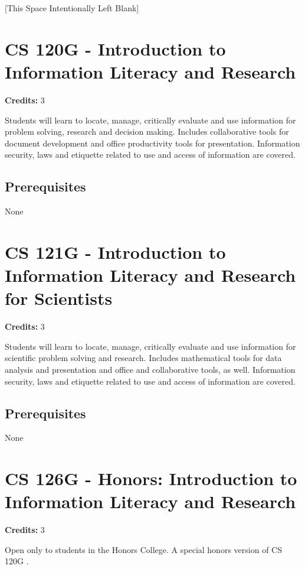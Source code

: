 \documentclass[]{article}
\newcommand{\pagebreakhere}{
\vspace*{\fill}
\begin{center}
[This Space Intentionally Left Blank]
\end{center}
\vspace*{\fill}
\newpage
}
\begin{document}
\pagebreakhere
\section{CS 120G - Introduction to Information Literacy and
Research}\label{cs-120g---introduction-to-information-literacy-and-research}

\textbf{Credits:} 3

Students will learn to locate, manage, critically evaluate and use
information for problem solving, research and decision making. Includes
collaborative tools for document development and office productivity
tools for presentation. Information security, laws and etiquette related
to use and access of information are covered.

\subsection{Prerequisites}\label{prerequisites-1}

None


\section{CS 121G - Introduction to Information Literacy and Research for
Scientists}\label{cs-121g---introduction-to-information-literacy-and-research-for-scientists}

\textbf{Credits:} 3

Students will learn to locate, manage, critically evaluate and use
information for scientific problem solving and research. Includes
mathematical tools for data analysis and presentation and office and
collaborative tools, as well. Information security, laws and etiquette
related to use and access of information are covered.

\subsection{Prerequisites}\label{prerequisites-2}

None

\section{CS 126G - Honors: Introduction to Information Literacy and
Research}\label{cs-126g---honors-introduction-to-information-literacy-and-research}

\textbf{Credits:} 3

Open only to students in the Honors College. A special honors version of
CS 120G .
\end{document}
